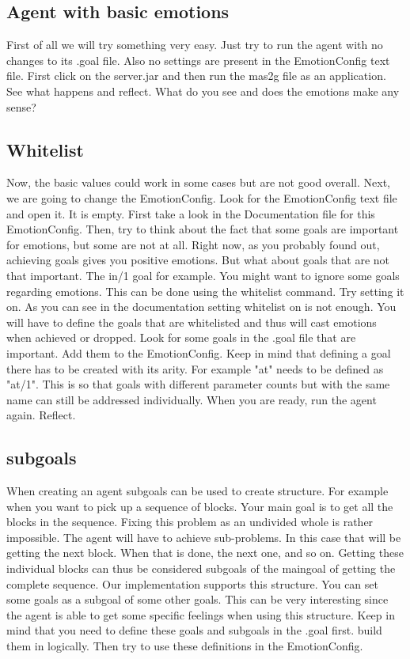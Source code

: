 \documentclass{scrartcl}
\begin{document}
\subsection{Agent with basic emotions}
First of all we will try something very easy. Just try to run the agent with no changes to its .goal file. Also no settings are present in the EmotionConfig text file. First click on the server.jar and then run the mas2g file as an application. See what happens and reflect. What do you see and does the emotions make any sense?

\subsection{Whitelist}
Now, the basic values could work in some cases but are not good overall. Next, we are going to change the EmotionConfig. Look for the EmotionConfig text file and open it. It is empty. First take a look in the Documentation file for this EmotionConfig. Then, try to think about the fact that some goals are important for emotions, but some are not at all. Right now, as you probably found out, achieving goals gives you positive emotions. But what about goals that are not that important. The in/1 goal for example. You might want to ignore some goals regarding emotions. This can be done using the whitelist command. Try setting it on. As you can see in the documentation setting whitelist on is not enough. You will have to define the goals that are whitelisted and thus will cast emotions when achieved or dropped. Look for some goals in the .goal file that are important. Add them to the EmotionConfig. Keep in mind that defining a goal there has to be created with its arity. For example "at" needs to be defined as "at/1". This is so that goals with different parameter counts but with the same name can still be addressed individually.
When you are ready, run the agent again. Reflect.

\subsection{subgoals}
When creating an agent subgoals can be used to create structure. For example when you want to pick up a sequence of blocks. Your main goal is to get all the blocks in the sequence. Fixing this problem as an undivided whole is rather impossible. The agent will have to achieve sub-problems. In this case that will be getting the next block. When that is done, the next one, and so on. Getting these individual blocks can thus be considered subgoals of the maingoal of getting the complete sequence. Our implementation supports this structure. You can set some goals as a subgoal of some other goals. This can be very interesting since the agent is able to get some specific feelings when using this structure. Keep in mind that you need to define these goals and subgoals in the .goal first. build them in logically. Then try to use these definitions in the EmotionConfig.
\end{document}
